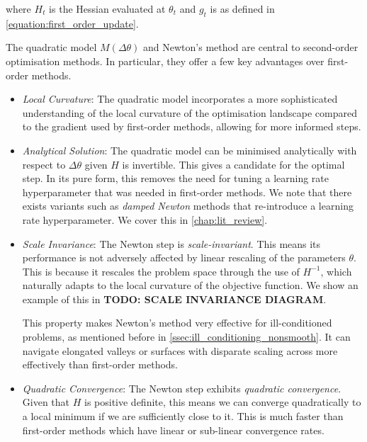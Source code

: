 where $H_t$ is the Hessian evaluated at $\theta_t$ and $g_t$ is as defined in \cref{equation:first_order_update}.




The quadratic model $M(\Delta \theta)$ and Newton's method are central to second-order optimisation methods. In particular, they offer a few key advantages over first-order methods. 

\begin{itemize}

    \item \textit{Local Curvature}: The quadratic model incorporates a more sophisticated understanding of the local curvature of the optimisation landscape compared to the gradient used by first-order methods, allowing for more informed steps.

    \item \textit{Analytical Solution}: The quadratic model can be minimised analytically with respect to $\Delta \theta$ given $H$ is invertible. This gives a candidate for the optimal step. In its pure form, this removes the need for tuning a learning rate hyperparameter that was needed in first-order methods. We note that there exists variants such as \textit{damped Newton} methods that re-introduce a learning rate hyperparameter. We cover this in \cref{chap:lit_review}.

    \item \textit{Scale Invariance}: The Newton step is \textit{scale-invariant}. This means its performance is not adversely affected by linear rescaling of the parameters $\theta$. This is because it rescales the problem space through the use of $H^{-1}$, which naturally adapts to the local curvature of the objective function. We show an example of this in \textbf{TODO: SCALE INVARIANCE DIAGRAM}.

    This property makes Newton's method very effective for ill-conditioned problems, as mentioned before in \cref{ssec:ill_conditioning_nonsmooth}. It can navigate elongated valleys or surfaces with disparate scaling across more effectively than first-order methods.

    \item \textit{Quadratic Convergence}: The Newton step exhibits \textit{quadratic convergence}. Given that $H$ is positive definite, this means we can converge quadratically to a local minimum if we are sufficiently close to it. This is much faster than first-order methods which have linear or sub-linear convergence rates.

\end{itemize}



